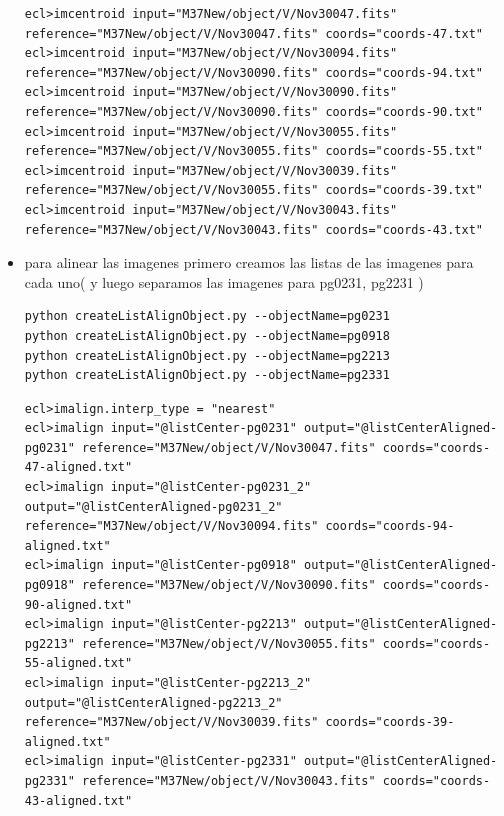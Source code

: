 \documentclass{article}
\begin{document}
\begin{itemize}
{\tiny 
\begin{verbatim}
ecl>imcentroid input="M37New/object/V/Nov30047.fits" reference="M37New/object/V/Nov30047.fits" coords="coords-47.txt"
ecl>imcentroid input="M37New/object/V/Nov30094.fits" reference="M37New/object/V/Nov30090.fits" coords="coords-94.txt"
ecl>imcentroid input="M37New/object/V/Nov30090.fits" reference="M37New/object/V/Nov30090.fits" coords="coords-90.txt"
ecl>imcentroid input="M37New/object/V/Nov30055.fits" reference="M37New/object/V/Nov30055.fits" coords="coords-55.txt"
ecl>imcentroid input="M37New/object/V/Nov30039.fits" reference="M37New/object/V/Nov30055.fits" coords="coords-39.txt"
ecl>imcentroid input="M37New/object/V/Nov30043.fits" reference="M37New/object/V/Nov30043.fits" coords="coords-43.txt"

\end{verbatim}
}

\item 

para alinear las imagenes primero creamos las listas de las imagenes para cada uno( y luego separamos  las imagenes para pg0231, pg2231 )

\begin{verbatim}
python createListAlignObject.py --objectName=pg0231
python createListAlignObject.py --objectName=pg0918
python createListAlignObject.py --objectName=pg2213
python createListAlignObject.py --objectName=pg2331

\end{verbatim}


{\tiny 
\begin{verbatim}
ecl>imalign.interp_type = "nearest" 
ecl>imalign input="@listCenter-pg0231" output="@listCenterAligned-pg0231" reference="M37New/object/V/Nov30047.fits" coords="coords-47-aligned.txt"
ecl>imalign input="@listCenter-pg0231_2" output="@listCenterAligned-pg0231_2" reference="M37New/object/V/Nov30094.fits" coords="coords-94-aligned.txt"
ecl>imalign input="@listCenter-pg0918" output="@listCenterAligned-pg0918" reference="M37New/object/V/Nov30090.fits" coords="coords-90-aligned.txt"
ecl>imalign input="@listCenter-pg2213" output="@listCenterAligned-pg2213" reference="M37New/object/V/Nov30055.fits" coords="coords-55-aligned.txt"
ecl>imalign input="@listCenter-pg2213_2" output="@listCenterAligned-pg2213_2" reference="M37New/object/V/Nov30039.fits" coords="coords-39-aligned.txt"
ecl>imalign input="@listCenter-pg2331" output="@listCenterAligned-pg2331" reference="M37New/object/V/Nov30043.fits" coords="coords-43-aligned.txt"



\end{verbatim}}
\end{itemize}
\end{document}
